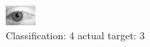 \begin{figure}[h!]
\begin{center}
\includegraphics[width=0.60\columnwidth]{figures/ID2815_class_4_target_3.png}
\end{center}
\caption{ Classification: 4 actual target: 3}
\label{fig:ID2815_class_4_target_3}
\end{figure}

